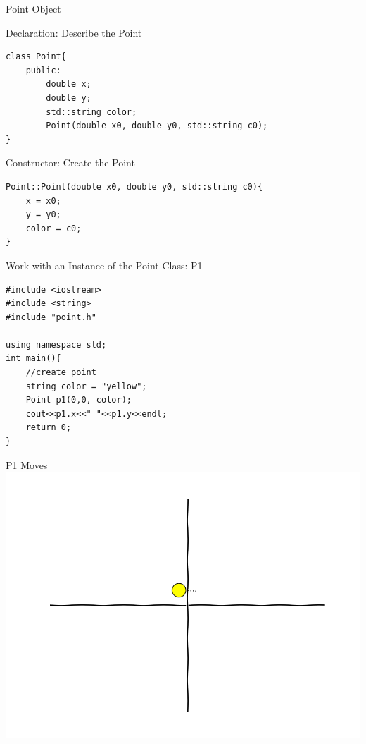 \documentclass[xcolor={dvipsnames}]{beamer}
\begin{document}
\begin{frame}[fragile]{Point Object}
\begin{block}{Declaration: Describe the Point}
\begin{verbatim}
class Point{
    public:
        double x;
        double y;
        std::string color;
        Point(double x0, double y0, std::string c0);
}
\end{verbatim}
\end{block}
\pause
\begin{block}{Constructor: Create the Point}
\begin{verbatim}
Point::Point(double x0, double y0, std::string c0){
    x = x0;
    y = y0;
    color = c0;
}
\end{verbatim}
\end{block}
\end{frame}

\begin{frame}[fragile]{Work with an Instance of the Point Class: P1}
\begin{verbatim}
#include <iostream>
#include <string>
#include "point.h"

using namespace std;
int main(){
    //create point
    string color = "yellow";
    Point p1(0,0, color);
    cout<<p1.x<<" "<<p1.y<<endl;
    return 0;
}
\end{verbatim}
\end{frame}

\begin{frame}{P1 Moves}
	\includegraphics[width=1\textwidth]{traj001}
\end{frame}
\end{document}
